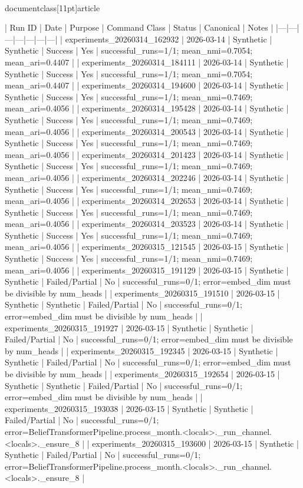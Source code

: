 \\documentclass[11pt]{article}
\begin{document}
\begin{CodeBlock}
| Run ID | Date | Purpose | Command Class | Status | Canonical | Notes |
|---|---|---|---|---|---|---|
| experiments_20260314_162932 | 2026-03-14 | Synthetic | Synthetic | Success | Yes | successful_runs=1/1; mean_nmi=0.7054; mean_ari=0.4407 |
| experiments_20260314_184111 | 2026-03-14 | Synthetic | Synthetic | Success | Yes | successful_runs=1/1; mean_nmi=0.7054; mean_ari=0.4407 |
| experiments_20260314_194600 | 2026-03-14 | Synthetic | Synthetic | Success | Yes | successful_runs=1/1; mean_nmi=0.7469; mean_ari=0.4056 |
| experiments_20260314_195428 | 2026-03-14 | Synthetic | Synthetic | Success | Yes | successful_runs=1/1; mean_nmi=0.7469; mean_ari=0.4056 |
| experiments_20260314_200543 | 2026-03-14 | Synthetic | Synthetic | Success | Yes | successful_runs=1/1; mean_nmi=0.7469; mean_ari=0.4056 |
| experiments_20260314_201423 | 2026-03-14 | Synthetic | Synthetic | Success | Yes | successful_runs=1/1; mean_nmi=0.7469; mean_ari=0.4056 |
| experiments_20260314_202246 | 2026-03-14 | Synthetic | Synthetic | Success | Yes | successful_runs=1/1; mean_nmi=0.7469; mean_ari=0.4056 |
| experiments_20260314_202653 | 2026-03-14 | Synthetic | Synthetic | Success | Yes | successful_runs=1/1; mean_nmi=0.7469; mean_ari=0.4056 |
| experiments_20260314_203523 | 2026-03-14 | Synthetic | Synthetic | Success | Yes | successful_runs=1/1; mean_nmi=0.7469; mean_ari=0.4056 |
| experiments_20260315_121545 | 2026-03-15 | Synthetic | Synthetic | Success | Yes | successful_runs=1/1; mean_nmi=0.7469; mean_ari=0.4056 |
| experiments_20260315_191129 | 2026-03-15 | Synthetic | Synthetic | Failed/Partial | No | successful_runs=0/1; error=embed_dim must be divisible by num_heads |
| experiments_20260315_191510 | 2026-03-15 | Synthetic | Synthetic | Failed/Partial | No | successful_runs=0/1; error=embed_dim must be divisible by num_heads |
| experiments_20260315_191927 | 2026-03-15 | Synthetic | Synthetic | Failed/Partial | No | successful_runs=0/1; error=embed_dim must be divisible by num_heads |
| experiments_20260315_192345 | 2026-03-15 | Synthetic | Synthetic | Failed/Partial | No | successful_runs=0/1; error=embed_dim must be divisible by num_heads |
| experiments_20260315_192654 | 2026-03-15 | Synthetic | Synthetic | Failed/Partial | No | successful_runs=0/1; error=embed_dim must be divisible by num_heads |
| experiments_20260315_193038 | 2026-03-15 | Synthetic | Synthetic | Failed/Partial | No | successful_runs=0/1; error=BeliefTransformerPipeline.process_month.<locals>._run_channel.<locals>._ensure_8 |
| experiments_20260315_193600 | 2026-03-15 | Synthetic | Synthetic | Failed/Partial | No | successful_runs=0/1; error=BeliefTransformerPipeline.process_month.<locals>._run_channel.<locals>._ensure_8 |

\end{CodeBlock}
\end{document}
